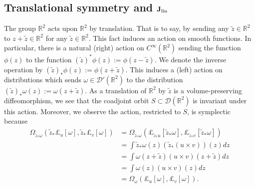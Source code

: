 \documentclass[12pt]{amsart}
\newcommand{\R}{\ensuremath{\mathbb{R}}}
\theoremstyle{remark}
\begin{document}
\subsection{Translational symmetry and ${\bf J}_{\rm lin}$}

The group $\mathbb{R}^2$ acts upon $\mathbb{R}^2$ by translation.
That is to say, by sending any $\tilde{z} \in \R^2$ to $z + \tilde{z} \in \R^2$ for any $\tilde{z}  \in \R^2$.
This fact induces an action on smooth functions.
In particular, there is a natural (right) action on $C^{\infty}(\mathbb{R}^2)$ sending the function $\phi(z)$ to the function  $(\tilde{z})^*\phi(z) := \phi(z-\tilde{z})$.
We denote the inverse operation by $(\tilde{z})_* \phi(z) := \phi( z + \tilde{z})$.
This induces a (left) action on distributions which sends $\omega \in \mathcal{D}'(\R^2)$ to the distribution $(\tilde{z})_*\omega(z) := \omega( z +\tilde{z})$.
As a translation of $\mathbb{R}^2$ by $\tilde{z}$ is a volume-preserving diffeomorphism, we see that the coadjoint orbit $S \subset \mathcal{D}(\mathbb{R}^2)$ is invariant under this action.
Moreover, we observe the action, restricted to $S$, is symplectic because
\begin{align*}
  \Omega_{ \tilde{z}_* \omega}( \tilde{z}_*\pounds_{u}[ \omega] , \tilde{z}_*\pounds_v[\omega] ) &= \Omega_{\tilde{z}_* \omega} ( \pounds_{\tilde{z}_*u}[ \tilde{z}_*\omega] ,
  \pounds_{\tilde{z}_*v}[\tilde{z}_*\omega] ) \\
  &= \int \tilde{z}_* \omega(z)  \left( \tilde{z}_*(u \times v) \right)(z) dz \\
  &= \int \omega( z+\tilde{z}) \left(u \times v \right)(z + \tilde{z}) dz \\ 
  &= \int \omega(z) \left( u \times v \right)(z) dz  \\
  &= \Omega_{\omega}( \pounds_u[\omega], \pounds_v[\omega]).
\end{align*}
\end{document}
